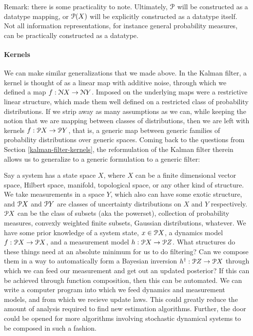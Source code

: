 Remark: there is some practicality to note. Ultimately, $\mathcal{P}$ will be constructed as a datatype mapping, or $\mathcal{P}(X)$ will be explicitly constructed as a datatype itself. Not all information representations, for instance general probability measures, can be practically constructed as a datatype.

\paragraph{Kernels}


We can make similar generalizations that we made above. In the Kalman filter, a kernel is thought of as a linear map with additive noise, through which we defined a map $f:\mathcal{N} X\rightarrow \mathcal{N} Y$. Imposed on the underlying maps were a restrictive linear structure, which made them well defined on a restricted class of probability distributions. If we strip away as many assumptions as we can, while keeping the notion that we are mapping between classes of distributions, then we are left with kernels $f:\mathcal{P} X \rightarrow \mathcal{P} Y$, that is, a generic map between generic families of probability distributions over generic spaces. Coming back to the questions from Section \ref{kalman-filter-kernels}, the reformulation of the Kalman filter therein allows us to generalize to a generic formulation to a generic filter:

Say a system has a state space $X$, where $X$ can be a finite dimensional vector space, Hilbert space, manifold, topological space, or any other kind of structure. We take measurements in a space $Y$, which also can have some exotic structure, and $\mathcal{P} X$ and $\mathcal{P} Y$ are classes of uncertainty distributions on $X$ and $Y$ respectively. $\mathcal{P} X$ can be the class of subsets (aka the powerset), collection of probability measures, convexly weighted finite subsets, Gaussian distributions, whatever. We have some prior knowledge of a system state, $x\in \mathcal{P} X$, a dynamics model $f:\mathcal{P} X\rightarrow \mathcal{P} X$, and a measurement model $h:\mathcal{P} X\rightarrow \mathcal{P} Z$. What structures do these things need at an absolute minimum for us to do filtering? Can we compose them in a way to automatically form a Bayesian inversion $h^\dagger : \mathcal{P} Z\rightarrow \mathcal{P} X$ through which we can feed our measurement and get out an updated posterior? If this can be achieved through function composition, then this can be automated. We can write a computer program into which we feed dynamics and measurement models, and from which we recieve update laws. This could greatly reduce the amount of analysis required to find new estimation algorithms. Further, the door could be opened for more algorithms involving stochastic dynamical systems to be composed in such a fashion.

